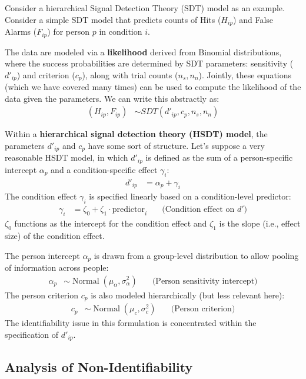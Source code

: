 \documentclass[12pt]{article}
\DeclareMathOperator{\Normal}{Normal}
\begin{document}
Consider a hierarchical Signal Detection Theory (SDT) model as an example. Consider a simple SDT model that predicts counts of Hits ($H_{ip}$) and False Alarms ($F_{ip}$) for person $p$ in condition $i$.

The data are modeled via a \textbf{likelihood} derived from Binomial distributions, where the success probabilities are determined by SDT parameters: sensitivity ($d'_{ip}$) and criterion ($c_p$), along with trial counts ($n_s, n_n$).  Jointly, these equations (which we have covered many times) can be used to compute the likelihood of the data given the parameters.  We can write this abstractly as:
\begin{align*}
  \left(H_{ip}, F_{ip}\right) &\sim SDT\left(d'_{ip}, c_p, n_s, n_n\right)
\end{align*}

Within a \textbf{hierarchical signal detection theory (HSDT) model}, the parameters $d'_{ip}$ and $c_p$ have some sort of structure.  Let's suppose a very reasonable HSDT model, in which $d'_{ip}$ is defined as the sum of a person-specific intercept $\alpha_p$ and a condition-specific effect $\gamma_i$:
\begin{align*}
  d'_{ip} &= \alpha_p + \gamma_i
\end{align*}
The condition effect $\gamma_i$ is specified linearly based on a condition-level predictor:
\begin{align*}
  \gamma_i &= \zeta_0 + \zeta_1 \cdot \text{predictor}_i \quad &\text{(Condition effect on } d')
\end{align*}
$\zeta_0$ functions as the intercept for the condition effect and $\zeta_1$ is the slope (i.e., effect size) of the condition effect.

The person intercept $\alpha_p$ is drawn from a group-level distribution to allow pooling of information across people:
\begin{align*}
  \alpha_p &\sim \Normal(\mu_\alpha, \sigma^2_\alpha) \quad &\text{(Person sensitivity intercept)}
\end{align*}
The person criterion $c_p$ is also modeled hierarchically (but less relevant here):
\begin{align*}
  c_p &\sim \Normal(\mu_c, \sigma^2_c) \quad &\text{(Person criterion)}
\end{align*}
The identifiability issue in this formulation is concentrated within the specification of $d'_{ip}$.


\subsection*{Analysis of Non-Identifiability}
\end{document}
